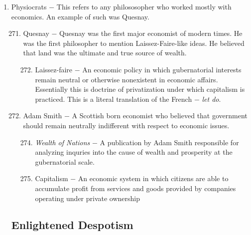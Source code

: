 \documentclass[12pt]{article}
\begin{document}
\begin{enumerate}
\begin{enumerate}[label=\arabic{*}.]
\end{enumerate}
\setcounter{enumi}{269}

\item Physiocrats $-$ This refers to any philososopher who worked mostly with economics. An example of such was Quesnay.

\begin{enumerate}[label=\arabic{*}.]
\setcounter{enumii}{270}

\item Quesnay $-$ Quesnay was the first major economist of modern times. He was the first philosopher to mention Laissez-Faire-like ideas. He believed that land was the ultimate and true source of wealth.

\begin{enumerate}[label=\arabic{*}.]
\setcounter{enumiii}{271}

\item Laissez-faire $-$ An economic policy in which gubernatorial interests remain neutral or otherwise nonexistent in economic affairs. Essentially this is doctrine of privatization under which capitalism is practiced. This is a literal translation of the French $-$ \textit{let do}.

\end{enumerate}
\setcounter{enumii}{272}

\item Adam Smith $-$ A Scottish born economist who believed that government should remain neutrally indifferent with respect to economic issues.

\begin{enumerate}[label=\arabic{*}.]
\setcounter{enumiii}{273}

\item \textit{Wealth of Nations} $-$ A publication by Adam Smith responsible for analyzing inquries into the cause of wealth and prosperity at the gubernatorial scale.

\item Capitalism $-$ An economic system in which citizens are able to accumulate profit from services and goods provided by companies operating under private ownership

\end{enumerate}

\end{enumerate}
\setcounter{enumi}{275}

\subsection{Enlightened Despotism}


\end{enumerate}
\end{document}
